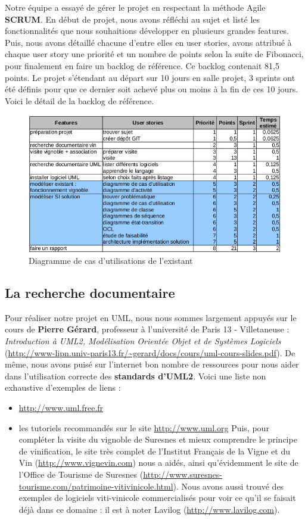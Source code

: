 \documentclass[a4paper, title]{report}
\begin{document}
Notre équipe a essayé de gérer le projet en respectant la méthode Agile
\textbf{SCRUM}. En début de projet, nous avons réfléchi au sujet et
listé les fonctionnalités que nous souhaitions développer en plusieurs
grandes features. Puis, nous avons détaillé chacune d'entre elles en
user stories, avons attribué à chaque user story une priorité et un
nombre de points selon la suite de Fibonacci, pour finalement en faire
un backlog de référence. Ce backlog contenait 81,5 points. Le projet
s'étendant au départ sur 10 jours en salle projet, 3 sprints ont été
définis pour que ce dernier soit achevé plus ou moins à la fin de ces 10
jours. Voici le détail de la backlog de référence.

\begin{figure}
\centering
\includegraphics{Images/GestionProjet.jpg}
\caption{Diagramme de cas d'utilisations de l'existant}
\end{figure}

\subsection{La recherche documentaire}\label{la-recherche-documentaire}

Pour réaliser notre projet en UML, nous nous sommes largement appuyés
sur le cours de \textbf{Pierre Gérard}, professeur à l'université de
Paris 13 - Villetaneuse : \emph{Introduction à UML2, Modélisation
Orientée Objet et de Systèmes Logiciels}
(\url{http://www-lipn.univ-paris13.fr/~gerard/docs/cours/uml-cours-slides.pdf}).
De même, nous avons puisé sur l'internet bon nombre de ressources pour
nous aider dans l'utilisation correcte des \textbf{standards d'UML2}.
Voici une liste non exhaustive d'exemples de liens : 
\begin{itemize}
\item \url{http://www.uml.free.fr}
\item les tutoriels recommandés sur le site
\url{http://www.uml.org} Puis, pour compléter la visite du vignoble de
Suresnes et mieux comprendre le principe de vinification, le site très
complet de l'Institut Français de la Vigne et du Vin
(\url{http://www.vignevin.com}) nous a aidés, ainsi qu'évidemment le
site de l'Office de Tourisme de Suresnes
(\url{http://www.suresnes-tourisme.com/patrimoine-vitivinicole.html}).
Nous avons aussi trouvé des exemples de logiciels viti-vinicole
commercialisés pour voir ce qu'il se faisait déjà dans ce domaine : il
est à noter Lavilog (\url{http://www.lavilog.com}).
\end{itemize}
\end{document}
